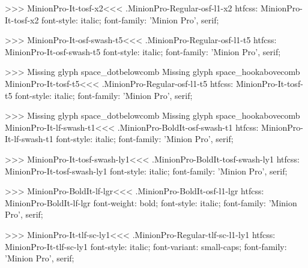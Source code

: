 {>>>
\<MinionPro-It-tosf-x2\><<<
.MinionPro-Regular-osf-l1-x2
htfcss:  MinionPro-It-tosf-x2  font-style: italic; font-family: 'Minion Pro', serif;

>>>
\<MinionPro-It-osf-swash-t5\><<<
.MinionPro-Regular-osf-l1-t5
htfcss:  MinionPro-It-osf-swash-t5  font-style: italic; font-family: 'Minion Pro', serif;

>>>
Missing glyph	space_dotbelowcomb
Missing glyph	space_hookabovecomb
\<MinionPro-It-tosf-t5\><<<
.MinionPro-Regular-osf-l1-t5
htfcss:  MinionPro-It-tosf-t5  font-style: italic; font-family: 'Minion Pro', serif;

>>>
Missing glyph	space_dotbelowcomb
Missing glyph	space_hookabovecomb
\<MinionPro-It-lf-swash-t1\><<<
.MinionPro-BoldIt-osf-swash-t1
htfcss:  MinionPro-It-lf-swash-t1  font-style: italic; font-family: 'Minion Pro', serif;

>>>
\<MinionPro-It-tosf-swash-ly1\><<<
.MinionPro-BoldIt-tosf-swash-ly1
htfcss:  MinionPro-It-tosf-swash-ly1  font-style: italic; font-family: 'Minion Pro', serif;

>>>
\<MinionPro-BoldIt-lf-lgr\><<<
.MinionPro-BoldIt-osf-l1-lgr
htfcss:  MinionPro-BoldIt-lf-lgr  font-weight: bold; font-style: italic; font-family: 'Minion Pro', serif;

>>>
\<MinionPro-It-tlf-sc-ly1\><<<
.MinionPro-Regular-tlf-sc-l1-ly1
htfcss:  MinionPro-It-tlf-sc-ly1  font-style: italic; font-variant: small-caps; font-family: 'Minion Pro', serif;

}
